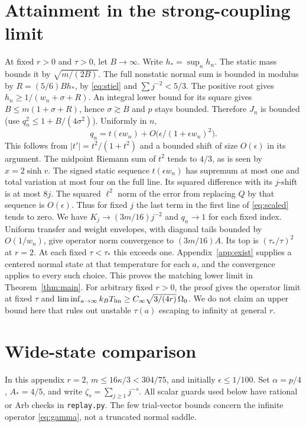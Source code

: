 \documentclass[11pt]{article}
\begin{document}
\section{Attainment in the strong-coupling limit}\label{sec:limit}
At fixed $r>0$ and $\tau>0$, let $B\to\infty$. Write $h_*=\sup_n h_n$. The static mass bounds it by $\sqrt{m/(2B)}$. The full nonstatic normal sum is bounded in modulus by $R=(5/6)Bh_*$, by \eqref{eq:stiel} and $\sum j^{-2}<5/3$. The positive root gives $h_n\ge1/(w_n+\sigma+R)$. An integral lower bound for its square gives $B\le m(1+\sigma+R)$, hence $\sigma\gtrsim B$ and $p$ stays bounded. Therefore $J_n$ is bounded (use $q_n^2\le1+B/(4\sigma^2)$). Uniformly in $n$,
\[
 q_n=t(\epsilon w_n)+O\big(\epsilon/(1+\epsilon w_n)^2\big).
\]
This follows from $|t'|=t^2/(1+t^2)$ and a bounded shift of size $O(\epsilon)$ in its argument. The midpoint Riemann sum of $t^2$ tends to $4/3$, as is seen by $x=2\sinh v$. The signed static sequence $t(\epsilon w_n)$ has supremum at most one and total variation at most four on the full line. Its squared difference with its $j$-shift is at most $8j$. The squared $\ell^2$ norm of the error from replacing $Q$ by that sequence is $O(\epsilon)$. Thus for fixed $j$ the last term in the first line of \eqref{eq:scaled} tends to zero. We have $K_j\to(3m/16)j^{-2}$ and $q_n\to1$ for each fixed index. Uniform transfer and weight envelopes, with diagonal tails bounded by $O(1/w_n)$, give operator norm convergence to $(3m/16)A$. Its top is $(\tau_*/\tau)^2$ at $r=2$. At each fixed $\tau<\tau_*$ this exceeds one. Appendix~\ref{app:exist} supplies a centered normal state at that temperature for each $a$, and the convergence applies to every such choice. This proves the matching lower limit in Theorem~\ref{thm:main}. For arbitrary fixed $r>0$, the proof gives the operator limit at fixed $\tau$ and $\liminf_{a\to\infty} k_BT_{\rm lin}\ge C_\infty\sqrt{3/(4r)}\,\Omega_0$. We do not claim an upper bound here that rules out unstable $\tau(a)$ escaping to infinity at general $r$.

\appendix
\section{Wide-state comparison}\label{app:wide}
In this appendix $r=2$, $m\le16\kappa/3<304/75$, and initially $\epsilon\le1/100$. Set $\alpha=p/4$, $A_*=4/5$, and write $\zeta_s=\sum_{j\ge1}j^{-s}$. All scalar guards used below have rational or Arb checks in \texttt{replay.py}. The few trial-vector bounds concern the infinite operator \eqref{eq:gamma}, not a truncated normal saddle.
\end{document}
